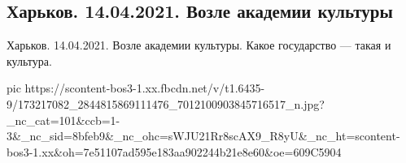  
 
 
 
 
\subsection{Харьков. 14.04.2021. Возле академии культуры}

Харьков. 14.04.2021. Возле академии культуры. Какое государство — такая и культура.

\ifcmt
  pic https://scontent-bos3-1.xx.fbcdn.net/v/t1.6435-9/173217082_2844815869111476_7012100903845716517_n.jpg?_nc_cat=101&ccb=1-3&_nc_sid=8bfeb9&_nc_ohc=sWJU21Rr8scAX9_R8yU&_nc_ht=scontent-bos3-1.xx&oh=7e51107ad595e183aa902244b21e8e60&oe=609C5904
\fi

